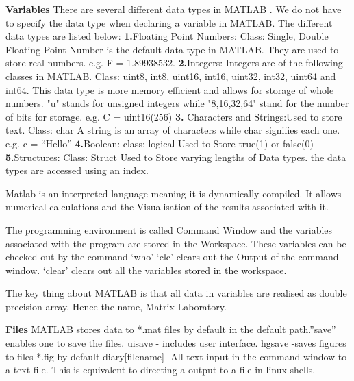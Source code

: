 \documentclass[fleqn,letterpaper,12pt]{report}
\begin{document}
\textbf{Variables}\newline
There are several different data types in MATLAB . We do not have to specify the data type when declaring a variable in MATLAB. 
The different data types are listed below:\newline
\textbf{1.}Floating Point Numbers: \newline
Class: Single, Double\newline
Floating Point Number is the default data type in MATLAB. They are used to store real numbers. e.g. F = 1.89938532. \newline
\textbf{2.}Integers: Integers are of the following classes in MATLAB.  
Class: uint8, int8, uint16, int16, uint32, int32, uint64 and int64.\newline
This data type is more memory efficient and allows for storage of whole numbers. "u" stands for unsigned integers while "8,16,32,64" stand for the number of bits for storage. e.g. C = uint16(256) \newline
\textbf{3.} Characters and Strings:Used to store text. \newline
Class: char \newline
A string is an array of characters while char signifies each one. e.g. c = “Hello” \newline
\textbf{4.}Boolean: \newline
class: logical \newline
Used to Store true(1) or false(0) \newline
\textbf{5.}Structures: \newline
Class: Struct \newline
Used to Store varying lengths of Data types. the data types are accessed using an index.

Matlab is an interpreted language meaning it is dynamically compiled. It allows numerical calculations and the Visualisation of the results associated with it.

The programming environment is called Command Window and the variables associated with the program are stored in the Workspace. These variables can be checked out by the command ‘who’
‘clc’ clears out the Output of the command window. ‘clear’ clears out all the variables stored in the workspace.

The key thing about MATLAB is that all data in variables are realised as double precision array. Hence the name, Matrix Laboratory.

\textbf{Files}\newline
MATLAB stores data to *.mat files by default in the default path.”save” enables one to save the files.\newline
uisave - includes user interface.\newline
hgsave -saves figures to files *.fig by default
diary[filename]- All text input in the command window to a text file. This is equivalent to directing a output to a file in linux shells.
\end{document}
